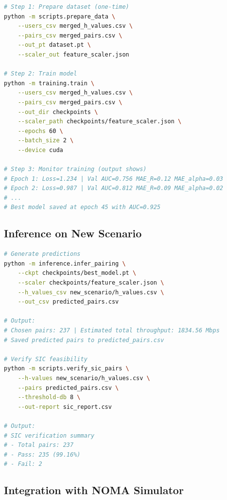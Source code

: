 \documentclass[12pt,a4paper]{article}
\begin{document}
\begin{lstlisting}[language=bash]
# Step 1: Prepare dataset (one-time)
python -m scripts.prepare_data \
    --users_csv merged_h_values.csv \
    --pairs_csv merged_pairs.csv \
    --out_pt dataset.pt \
    --scaler_out feature_scaler.json

# Step 2: Train model
python -m training.train \
    --users_csv merged_h_values.csv \
    --pairs_csv merged_pairs.csv \
    --out_dir checkpoints \
    --scaler_path checkpoints/feature_scaler.json \
    --epochs 60 \
    --batch_size 2 \
    --device cuda

# Step 3: Monitor training (output shows)
# Epoch 1: Loss=1.234 | Val AUC=0.756 MAE_R=0.12 MAE_alpha=0.03
# Epoch 2: Loss=0.987 | Val AUC=0.812 MAE_R=0.09 MAE_alpha=0.02
# ...
# Best model saved at epoch 45 with AUC=0.925
\end{lstlisting}

\subsection{Inference on New Scenario}

\begin{lstlisting}[language=bash]
# Generate predictions
python -m inference.infer_pairing \
    --ckpt checkpoints/best_model.pt \
    --scaler checkpoints/feature_scaler.json \
    --h_values_csv new_scenario/h_values.csv \
    --out_csv predicted_pairs.csv

# Output:
# Chosen pairs: 237 | Estimated total throughput: 1834.56 Mbps
# Saved predicted pairs to predicted_pairs.csv

# Verify SIC feasibility
python -m scripts.verify_sic_pairs \
    --h-values new_scenario/h_values.csv \
    --pairs predicted_pairs.csv \
    --threshold-db 8 \
    --out-report sic_report.csv

# Output:
# SIC verification summary
# - Total pairs: 237
# - Pass: 235 (99.16%)
# - Fail: 2
\end{lstlisting}

\subsection{Integration with NOMA Simulator}
\end{document}
